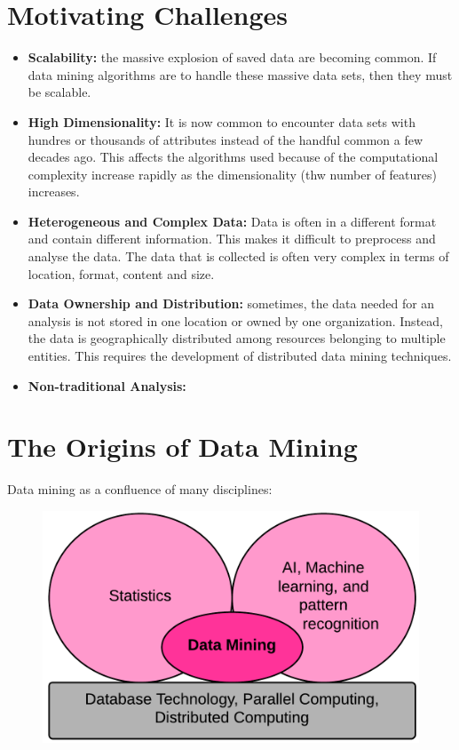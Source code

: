\section{Motivating Challenges}

	\begin{itemize}
		\item {\bf Scalability:} the massive explosion of saved data are becoming common. If data mining 
		algorithms are to handle these massive data sets, then they must be scalable.
		\item {\bf High Dimensionality:} It is now common to encounter data sets with hundres or thousands 
		of attributes instead of the handful common a few decades ago. This affects the algorithms used 
		because of the computational complexity increase rapidly as the dimensionality (thw number of 
		features) increases.
		\item {\bf Heterogeneous and Complex Data:} Data is often in a different format and contain different
		information. This makes it difficult to preprocess and analyse the data. The data that is collected is
		often very complex in terms of location, format, content and size. 
		\item {\bf Data Ownership and Distribution:} sometimes, the data needed for an analysis is not 
		stored in one location or owned by one organization. Instead, the data is geographically distributed 
		among resources belonging to multiple entities. This requires the development of distributed
		data mining techniques. 
		\item {\bf Non-traditional Analysis:} 
	\end{itemize}

\clearpage
\section{The Origins of Data Mining}

	Data mining as a confluence of many disciplines:

	\begin{figure}[H]
		\includegraphics[scale=0.3]{pics/disciplinesDataMining.png}
	\end{figure}

